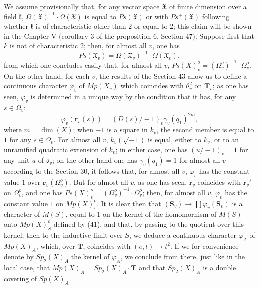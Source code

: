 \documentclass[12pt]{amsart}
\begin{document}
We assume provisionally that, for any vector space $\mathfrak{X}$
of finite dimension over a field $\mathfrak{k}$, $\Omega(\mathfrak{X})^{-1}\cdot\Omega(\mathfrak{X})$
is equal to $Ps(\mathfrak{X})$ or with $Ps^{+}(\mathfrak{X})$ following
whether $\mathfrak{k}$ is of characteristic other than $2$ or equal
to $2$; this claim will be shown in the Chapter V (corollary $3$
of the proposition $6$, Section $47$). Suppose first that $k$ is
not of characteristic $2$; then, for almost all $v$, one has\[
Ps(\mathfrak{X}_{v})=\Omega(\mathfrak{X}_{v})^{-1}\cdot\Omega(\mathfrak{X}_{v}),\]
from which one concludes easily that, for almost all $v$, $Ps(X)_{v}^{o}=(\Omega_{v}^{o})^{-1}\cdot\Omega_{v}^{o}$.
On the other hand, for each $v$, the results of the Section $43$
allow us to define a continuous character $\varphi_{v}$ of $Mp(X_{v})$
which coincides with $\theta_{v}^{2}$ on $\mathbf{T}_{v}$; as one
has seen, $\varphi_{v}$ is determined in a unique way by the condition
that it has, for any $s\in\Omega_{v}$:\[
\varphi_{v}(\mathbf{r}_{v}(s))=(D(s)/-1)_{v}\gamma_{v}(q_{1})^{2m},\]
where $m=\dim(X)$; when $-1$ is a square in $k_{v}$, the second
member is equal to $1$ for any $s\in\Omega_{v}$. For almost all
$v$, $k_{v}(\sqrt{-1})$ is equal, either to $k_{v}$, or to an unramified
quadratic extension of $k_{v}$; in either case, one has $(u/-1)_{v}=1$
for any unit $u$ of $\mathfrak{o}_{v}$; on the other hand one has
$\gamma_{v}(q_{1})=1$ for almost all $v$ according to the Section
$30$, it follows that, for almost all $v$, $\varphi_{v}$ has the
constant value $1$ over $\mathbf{r}_{v}(\Omega_{v}^{o})$. But for
almost all $v$, as one has seen, $\mathbf{r}_{v}$ coincides with
$\mathbf{r}_{v}'$ on $\Omega_{v}^{o}$, and one has $Ps(X)_{v}^{o}=(\Omega_{v}^{o})^{-1}\cdot\Omega_{v}^{o}$;
then, for almost all $v$, $\varphi_{v}$ has the constant value $1$
on $Mp(X)_{v}^{o}$. It is clear then that $(\mathbf{S}_{v})\to\prod\varphi_{v}(\mathbf{S}_{v})$
is a character of $M(S)$, equal to $1$ on the kernel of the homomorhism
of $M(S)$ onto $Mp(X)_{S}^{o}$ defined by (41), and that, by passing
to the quotient over this kernel, then to the inductive limit over
$S$, we deduce a continuous character $\varphi_{A}$ of $Mp(X)_{A}$,
which, over $\mathbf{T}$, coincides with $(e,t)\to t^{2}$. If we
for convenience denote by $Sp_{2}(X)_{A}$ the kernel of $\varphi_{A}$,
we conclude from there, just like in the local case, that $Mp(X)_{A}=Sp_{2}(X)_{A}\cdot\mathbf{T}$
and that $Sp_{2}(X)_{A}$ is a double covering of $Sp(X)_{A}$.
\end{document}
